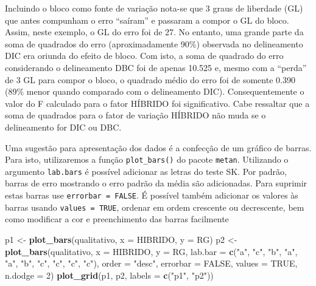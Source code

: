 \documentclass[
]{book}
\newenvironment{Shaded}{\begin{snugshade}}{\end{snugshade}}
\newcommand{\DataTypeTok}[1]{\textcolor[rgb]{0.13,0.29,0.53}{#1}}
\newcommand{\DecValTok}[1]{\textcolor[rgb]{0.00,0.00,0.81}{#1}}
\newcommand{\KeywordTok}[1]{\textcolor[rgb]{0.13,0.29,0.53}{\textbf{#1}}}
\newcommand{\NormalTok}[1]{#1}
\newcommand{\OtherTok}[1]{\textcolor[rgb]{0.56,0.35,0.01}{#1}}
\newcommand{\StringTok}[1]{\textcolor[rgb]{0.31,0.60,0.02}{#1}}
\numberwithin{equation}{section}
\begin{document}
Incluindo o bloco como fonte de variação nota-se que 3 graus de liberdade (GL) que antes compunham o erro ``saíram'' e passaram a compor o GL do bloco. Assim, neste exemplo, o GL do erro foi de 27. No entanto, uma grande parte da soma de quadrados do erro (aproximadamente 90\%) observada no delineamento DIC era oriunda do efeito de bloco. Com isto, a soma de quadrado do erro considerando o delineamento DBC foi de apenas 10.525 e, mesmo com a ``perda'' de 3 GL para compor o bloco, o quadrado médio do erro foi de somente 0.390 (89\% menor quando comparado com o delineamento DIC). Consequentemente o valor do F calculado para o fator HÍBRIDO foi significativo. Cabe ressaltar que a soma de quadrados para o fator de variação HÍBRIDO não muda se o delineamento for DIC ou DBC.

Uma sugestão para apresentação dos dados é a confecção de um gráfico de barras. Para isto, utilizaremos a função \texttt{plot\_bars()} do pacote \texttt{metan}. Utilizando o argumento \texttt{lab.bars} é possível adicionar as letras do teste SK. Por padrão, barras de erro mostrando o erro padrão da média são adicionadas. Para suprimir estas barras use \texttt{errorbar\ =\ FALSE}. É possível também adicionar os valores às barras usando \texttt{values\ =\ TRUE}, ordenar em ordem crescente ou decrescente, bem como modificar a cor e preenchimento das barras facilmente

\begin{Shaded}
\begin{Highlighting}[]
\NormalTok{p1 \textless{}{-}}\StringTok{ }\KeywordTok{plot\_bars}\NormalTok{(qualitativo, }\DataTypeTok{x =}\NormalTok{ HIBRIDO, }\DataTypeTok{y =}\NormalTok{ RG)}
\NormalTok{p2 \textless{}{-}}\StringTok{ }\KeywordTok{plot\_bars}\NormalTok{(qualitativo,}
                \DataTypeTok{x =}\NormalTok{ HIBRIDO,}
                \DataTypeTok{y =}\NormalTok{ RG,}
                \DataTypeTok{lab.bar =} \KeywordTok{c}\NormalTok{(}\StringTok{"a"}\NormalTok{, }\StringTok{"c"}\NormalTok{, }\StringTok{"b"}\NormalTok{, }\StringTok{"a"}\NormalTok{, }\StringTok{"a"}\NormalTok{, }\StringTok{"b"}\NormalTok{, }\StringTok{"c"}\NormalTok{, }\StringTok{"c"}\NormalTok{, }\StringTok{"c"}\NormalTok{, }\StringTok{"c"}\NormalTok{),}
                \DataTypeTok{order =} \StringTok{"desc"}\NormalTok{,}
                \DataTypeTok{errorbar =} \OtherTok{FALSE}\NormalTok{,}
                \DataTypeTok{values =} \OtherTok{TRUE}\NormalTok{,}
                \DataTypeTok{n.dodge =} \DecValTok{2}\NormalTok{)}
\KeywordTok{plot\_grid}\NormalTok{(p1, p2, }\DataTypeTok{labels =} \KeywordTok{c}\NormalTok{(}\StringTok{"p1"}\NormalTok{, }\StringTok{"p2"}\NormalTok{))}
\end{Highlighting}
\end{Shaded}
\end{document}
